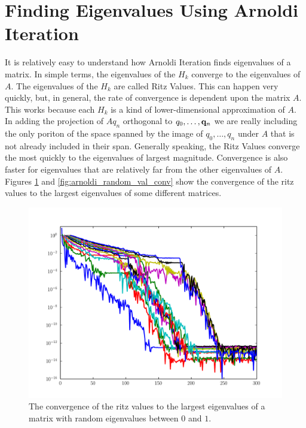 
\section*{Finding Eigenvalues Using Arnoldi Iteration}

It is relatively easy to understand how Arnoldi Iteration finds eigenvalues of a matrix.
In simple terms, the eigenvalues of the $H_k$ converge to the eigenvalues of $A$.
The eigenvalues of the $H_k$ are called Ritz Values.
This can happen very quickly, but, in general, the rate of convergence is dependent upon the matrix $A$.
This works because each $H_k$ is a kind of lower-dimensional approximation of $A$.
In adding the projection of $A q_n$ orthogonal to $q_0, \dots, {\bf q}_n$ we are really including the only poriton of the space spanned by the image of $q_0, \dots, q_n$ under $A$ that is not already included in their span.
Generally speaking, the Ritz Values converge the most quickly to the eigenvalues of largest magnitude.
Convergence is also faster for eigenvalues that are relatively far from the other eigenvalues of $A$.
Figures \ref{fig:arnoldi_random_eig_conv} and \ref{fig:arnoldi_random_val_conv} show the convergence of the ritz values to the largest eigenvalues of some different matrices.

\begin{figure}
\includegraphics[width=\textwidth]{rand_eigs_conv.pdf}
\caption{The convergence of the ritz values to the largest eigenvalues of a matrix with random eigenvalues between $0$ and $1$.}
\label{fig:arnoldi_random_eig_conv}
\end{figure}

